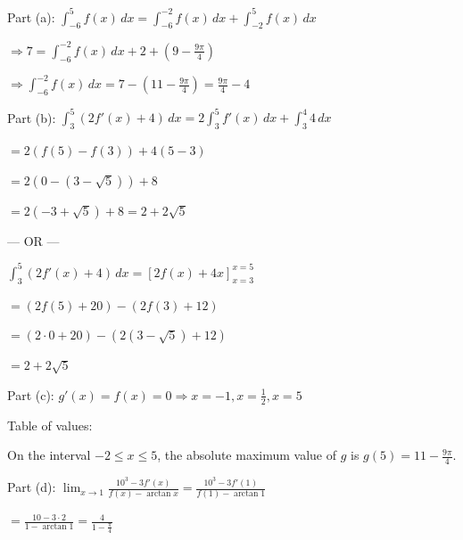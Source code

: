 \documentclass[12pt,addpoints,answers]{exam}
\begin{document}
\begin{questions}
\begin{solution}
Part (a): $\int_{-6}^{5} f(x)\,dx = \int_{-6}^{-2} f(x)\,dx + \int_{-2}^{5} f(x)\,dx$ \par $\Rightarrow 7 = \int_{-6}^{-2} f(x)\,dx + 2 + \left(9 - \frac{9\pi}{4}\right)$ \par $\Rightarrow \int_{-6}^{-2} f(x)\,dx = 7 - \left(11 - \frac{9\pi}{4}\right) = \frac{9\pi}{4} - 4$ \par Part (b): $\int_{3}^{5} (2f'(x) + 4)\,dx = 2\int_{3}^{5} f'(x)\,dx + \int_{3}^{4} 4\,dx$ \par $= 2(f(5) - f(3)) + 4(5 - 3)$ \par $= 2(0 - (3 - \sqrt{5})) + 8$ \par $= 2(-3 + \sqrt{5}) + 8 = 2 + 2\sqrt{5}$ \par — OR — \par $\int_{3}^{5} (2f'(x) + 4)\,dx = [2f(x) + 4x]_{x=3}^{x=5}$ \par $= (2f(5) + 20) - (2f(3) + 12)$ \par $= (2 \cdot 0 + 20) - (2(3 - \sqrt{5}) + 12)$ \par $= 2 + 2\sqrt{5}$ \par Part (c): $g'(x) = f(x) = 0 \Rightarrow x = -1, x = \frac{1}{2}, x = 5$ \par Table of values: \par On the interval $-2 \le x \le 5$, the absolute maximum value of $g$ is $g(5) = 11 - \frac{9\pi}{4}$. \par Part (d): $\lim_{x \to 1} \frac{10^3 - 3f'(x)}{f(x) - \arctan x} = \frac{10^3 - 3f'(1)}{f(1) - \arctan 1}$ \par $= \frac{10 - 3 \cdot 2}{1 - \arctan 1} = \frac{4}{1 - \frac{\pi}{4}}$

\end{solution}
\end{questions}
\end{document}
